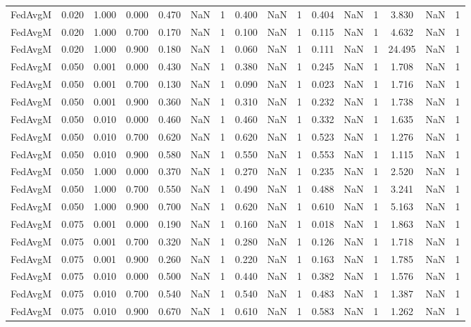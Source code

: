 \begin{table}[htbp]
\begin{tabular}{lccccccccccccccc}
FedAvgM & 0.020 & 1.000 & 0.000 & 0.470 & NaN & 1 & 0.400 & NaN & 1 & 0.404 & NaN & 1 & 3.830 & NaN & 1 \\
FedAvgM & 0.020 & 1.000 & 0.700 & 0.170 & NaN & 1 & 0.100 & NaN & 1 & 0.115 & NaN & 1 & 4.632 & NaN & 1 \\
FedAvgM & 0.020 & 1.000 & 0.900 & 0.180 & NaN & 1 & 0.060 & NaN & 1 & 0.111 & NaN & 1 & 24.495 & NaN & 1 \\
FedAvgM & 0.050 & 0.001 & 0.000 & 0.430 & NaN & 1 & 0.380 & NaN & 1 & 0.245 & NaN & 1 & 1.708 & NaN & 1 \\
FedAvgM & 0.050 & 0.001 & 0.700 & 0.130 & NaN & 1 & 0.090 & NaN & 1 & 0.023 & NaN & 1 & 1.716 & NaN & 1 \\
FedAvgM & 0.050 & 0.001 & 0.900 & 0.360 & NaN & 1 & 0.310 & NaN & 1 & 0.232 & NaN & 1 & 1.738 & NaN & 1 \\
FedAvgM & 0.050 & 0.010 & 0.000 & 0.460 & NaN & 1 & 0.460 & NaN & 1 & 0.332 & NaN & 1 & 1.635 & NaN & 1 \\
FedAvgM & 0.050 & 0.010 & 0.700 & 0.620 & NaN & 1 & 0.620 & NaN & 1 & 0.523 & NaN & 1 & 1.276 & NaN & 1 \\
FedAvgM & 0.050 & 0.010 & 0.900 & 0.580 & NaN & 1 & 0.550 & NaN & 1 & 0.553 & NaN & 1 & 1.115 & NaN & 1 \\
FedAvgM & 0.050 & 1.000 & 0.000 & 0.370 & NaN & 1 & 0.270 & NaN & 1 & 0.235 & NaN & 1 & 2.520 & NaN & 1 \\
FedAvgM & 0.050 & 1.000 & 0.700 & 0.550 & NaN & 1 & 0.490 & NaN & 1 & 0.488 & NaN & 1 & 3.241 & NaN & 1 \\
FedAvgM & 0.050 & 1.000 & 0.900 & 0.700 & NaN & 1 & 0.620 & NaN & 1 & 0.610 & NaN & 1 & 5.163 & NaN & 1 \\
FedAvgM & 0.075 & 0.001 & 0.000 & 0.190 & NaN & 1 & 0.160 & NaN & 1 & 0.018 & NaN & 1 & 1.863 & NaN & 1 \\
FedAvgM & 0.075 & 0.001 & 0.700 & 0.320 & NaN & 1 & 0.280 & NaN & 1 & 0.126 & NaN & 1 & 1.718 & NaN & 1 \\
FedAvgM & 0.075 & 0.001 & 0.900 & 0.260 & NaN & 1 & 0.220 & NaN & 1 & 0.163 & NaN & 1 & 1.785 & NaN & 1 \\
FedAvgM & 0.075 & 0.010 & 0.000 & 0.500 & NaN & 1 & 0.440 & NaN & 1 & 0.382 & NaN & 1 & 1.576 & NaN & 1 \\
FedAvgM & 0.075 & 0.010 & 0.700 & 0.540 & NaN & 1 & 0.540 & NaN & 1 & 0.483 & NaN & 1 & 1.387 & NaN & 1 \\
FedAvgM & 0.075 & 0.010 & 0.900 & 0.670 & NaN & 1 & 0.610 & NaN & 1 & 0.583 & NaN & 1 & 1.262 & NaN & 1 \\

\end{tabular}
\end{table}
